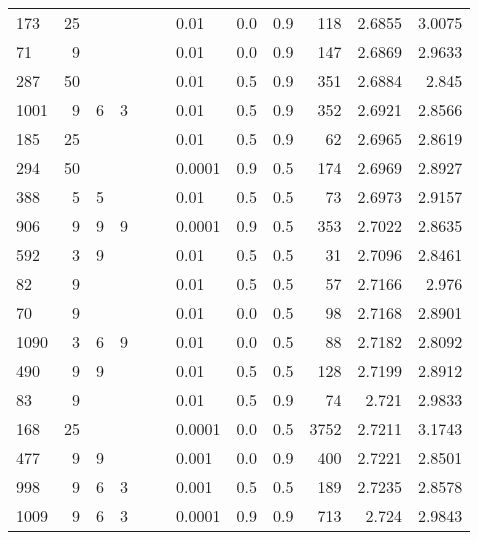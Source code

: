\begin{longtable}{lrrrrrlrrrrr}
  173 &      25 &   &   &   &   &          0.01 &      0.0 &    0.9 &     118 &     2.6855 &        3.0075 \\
   71 &       9 &   &   &   &   &          0.01 &      0.0 &    0.9 &     147 &     2.6869 &        2.9633 \\
  287 &      50 &   &   &   &   &          0.01 &      0.5 &    0.9 &     351 &     2.6884 &         2.845 \\
 1001 &       9 & 6 & 3 &   &   &          0.01 &      0.5 &    0.9 &     352 &     2.6921 &        2.8566 \\
  185 &      25 &   &   &   &   &          0.01 &      0.5 &    0.9 &      62 &     2.6965 &        2.8619 \\
  294 &      50 &   &   &   &   &        0.0001 &      0.9 &    0.5 &     174 &     2.6969 &        2.8927 \\
  388 &       5 & 5 &   &   &   &          0.01 &      0.5 &    0.5 &      73 &     2.6973 &        2.9157 \\
  906 &       9 & 9 & 9 &   &   &        0.0001 &      0.9 &    0.5 &     353 &     2.7022 &        2.8635 \\
  592 &       3 & 9 &   &   &   &          0.01 &      0.5 &    0.5 &      31 &     2.7096 &        2.8461 \\
   82 &       9 &   &   &   &   &          0.01 &      0.5 &    0.5 &      57 &     2.7166 &         2.976 \\
   70 &       9 &   &   &   &   &          0.01 &      0.0 &    0.5 &      98 &     2.7168 &        2.8901 \\
 1090 &       3 & 6 & 9 &   &   &          0.01 &      0.0 &    0.5 &      88 &     2.7182 &        2.8092 \\
  490 &       9 & 9 &   &   &   &          0.01 &      0.5 &    0.5 &     128 &     2.7199 &        2.8912 \\
   83 &       9 &   &   &   &   &          0.01 &      0.5 &    0.9 &      74 &      2.721 &        2.9833 \\
  168 &      25 &   &   &   &   &        0.0001 &      0.0 &    0.5 &    3752 &     2.7211 &        3.1743 \\
  477 &       9 & 9 &   &   &   &         0.001 &      0.0 &    0.9 &     400 &     2.7221 &        2.8501 \\
  998 &       9 & 6 & 3 &   &   &         0.001 &      0.5 &    0.5 &     189 &     2.7235 &        2.8578 \\
 1009 &       9 & 6 & 3 &   &   &        0.0001 &      0.9 &    0.9 &     713 &      2.724 &        2.9843 \\

\end{longtable}
